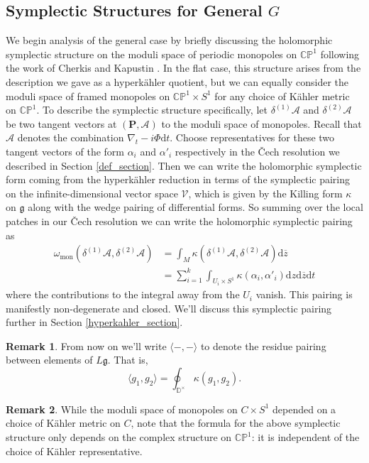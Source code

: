\documentclass[11pt, oneside, reqno]{amsart}
\theoremstyle{definition} \newtheorem{definition}{Definition}[section]
\theoremstyle{definition} \newtheorem{remark}[definition]{Remark}
\theoremstyle{definition} \newtheorem{remarks}[definition]{Remarks}
\theoremstyle{definition} \newtheorem{question}[definition]{Question}
\theoremstyle{definition} \newtheorem*{note}{Note}
\theoremstyle{definition} \newtheorem{example}[definition]{Example}
\theoremstyle{definition} \newtheorem{examples}[definition]{Examples}
\renewcommand{\gg}{\mathfrak{g}}
\newcommand{\bb}[1]{\mathbb{#1}}
\newcommand{\mr}[1]{\mathrm{#1}}
\newcommand{\mc}[1]{\mathcal{#1}}
\newcommand{\bo}[1]{\boldsymbol{#1}}
\newcommand{\ol}[1]{\overline{#1}}
\renewcommand{\d}{\mathrm{d}}
\begin{document}
\subsection{Symplectic Structures for General $G$} \label{general_symplectic_sec}
We begin analysis of the general case by briefly discussing the holomorphic symplectic structure on the moduli space of periodic monopoles on $\bb{CP}^1$ following the work of Cherkis and Kapustin \cite{CherkisKapustin1, CherkisKapustin3}.  In the flat case, this structure arises from the description we gave as a hyperk\"ahler quotient, but we can equally consider the moduli space of framed monopoles on $\bb{CP}^1 \times S^1$ for any choice of K\"ahler metric on $\bb{CP}^1$.  To describe the symplectic structure specifically, let $\delta^{(1)} \mc A$ and $\delta^{(2)} \mc A$ be two tangent vectors at $(\bo P, \mc A)$ to the moduli space of monopoles.  Recall that $\mc A$ denotes the combination $\nabla_t - i\Phi \d t$.  Choose representatives for these two tangent vectors of the form $\alpha_i$ and $\alpha'_i$ respectively in the \v Cech resolution we described in Section \ref{def_section}.  Then we can write the holomorphic symplectic form coming from the hyperk\"ahler reduction in terms of the symplectic pairing on the infinite-dimensional vector space $\mc V$, which is given by the Killing form $\kappa$ on $\gg$ along with the wedge pairing of differential forms.  So summing over the local patches in our \v Cech resolution we can write the holomorphic symplectic pairing as
\begin{align*}
\omega_{\mr{mon}}(\delta^{(1)} \mc A, \delta^{(2)} \mc A) &= \int_{M} \kappa(\delta^{(1)} \mc A, \delta^{(2)} \mc A) \d \ol{z} \\
&= \sum_{i=1}^k \int_{U_i \times S^1} \kappa(\alpha_i, \alpha'_i) \d z \d \ol{z} \d t
\end{align*}
where the contributions to the integral away from the $U_i$ vanish.  This pairing is manifestly non-degenerate and closed.  We'll discuss this symplectic pairing further in Section \ref{hyperkahler_section}.

\begin{remark}
From now on we'll write $\langle - , - \rangle$ to denote the residue pairing between elements of $L\gg$.  That is, 
\[\langle g_1, g_2 \rangle = \oint_{\bb D^\times} \kappa(g_1, g_2).\]
\end{remark}

\begin{remark}
While the moduli space of monopoles on $C \times S^1$ depended on a choice of K\"ahler metric on $C$, note that the formula for the above symplectic structure only depends on the complex structure on $\bb{CP}^1$: it is independent of the choice of K\"ahler representative.
\end{remark}
\end{document}
